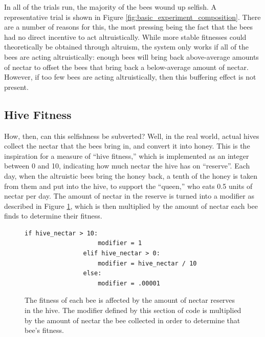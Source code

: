 \documentclass[11pt, letter]{article}
\begin{document}
			In all of the trials run, the majority of the bees wound up selfish. A representative trial is shown in Figure \ref{fig:basic_experiment_composition}. There are a number of reasons for this, the most pressing being the fact that the bees had no direct incentive to act altruistically. While more stable fitnesses could theoretically be obtained through altruism, the system only works if all of the bees are acting altruistically: enough bees will bring back above-average amounts of nectar to offset the bees that bring back a below-average amount of nectar. However, if too few bees are acting altruistically, then this buffering effect is not present. 


		\subsection{Hive Fitness} %
		\label{sub:hive_fitness}
				How, then, can this selfishness be subverted? Well, in the real world, actual hives collect the	 nectar that the bees bring in, and convert it into honey. This is the inspiration for a measure of ``hive fitness,'' which is implemented as an integer between 0 and 10, indicating how much nectar the hive has on ``reserve''. Each day, when the altruistic bees bring the honey back, a tenth of the honey is taken from them and put into the hive, to support the ``queen,'' who eats 0.5 units of nectar per day. The amount of nectar in the reserve is turned into a modifier as described in Figure \ref{fig:modifier_algorithm}, which is then multiplied by the amount of nectar each bee finds to determine their fitness.

			\begin{figure}[tbh!]
				\begin{Verbatim}[frame=single]
                if hive_nectar > 10:
                    modifier = 1
                elif hive_nectar > 0:
                    modifier = hive_nectar / 10
                else:
                    modifier = .00001 
				\end{Verbatim}
				\caption{The fitness of each bee is affected by the amount of nectar reserves in the hive. The modifier defined by this section of code is multiplied by the amount of nectar the bee collected in order to determine that bee's fitness.}
				\label{fig:modifier_algorithm}
			\end{figure}
\end{document}
